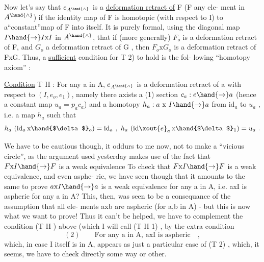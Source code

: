 
Now let's say that $e_{A^{\hand{\wedge}}}$ is a  \uline{deformation retract of} F (F any ele-%
ment in $A^{\hand{\wedge}}$) if the identity map of F is homotopic (with respect to I) to
a``constant''map of F into itself.  It is purely formal,  using the diagonal
map $I\hand{\to} I\mathrm{x}I$ in $A^{\hand{\wedge}}$,  that if (more generally) $F_o$ is a deformation retract
of F,  and $G_o$ a deformation retract of G ,  then $F_o\mathrm{x}G_o$ is a deformation
retract of FxG. Thus, a \uline{sufficient} condition for T 2) to hold is the fol-%
lowing ``homotopy axiom'' :

\uline{Condition}  T H :  For any  a in A,   $e_{A^{\hand{\wedge}}}$ is a deformation retract of
a with respect to $(I,e_o,e_1)$,  namely there axists a
(1)  section  $c_a : e\hand{\to} a$  (hence a constant map $u_a = p_a c_a$)
and a homotopy  $h_a : a\ \mathrm{x}\ I\hand{\to} a$ from $\mathrm{id}_a$  to $u_a$ ,  i.e.
a map $h_a$ such that
\[ h_a\ (\mathrm{id}_a\,\mathrm{x}\hand{$\delta$}_o) = \mathrm{id}_a\ ,\ h_a\ (\mathrm{id}\xout{e}_a\,\mathrm{x}\hand{$\delta$}_1) = u_a\ . \]

We have to be cautious though,  it oddurs to me now,  not to make a
``vicious circle'',  as the  argument used yesterday  makes use of the fact
that   $F\mathrm{x}I\hand{\to} F$  is a weak equivalence  To check that $F\mathrm{x}I\hand{\to} F$ is a weak equivalence,  and even asphe-%
ric,  we have seen though that it amounts to the same to prove $a\mathrm{x}I\hand{\to} a$ is a
weak equivalence for any a in A,  i.e. axI is aspheric for any a in A?
This,  then,  was seen to be a consequance of the assumption that all ele-%
ments axb are aspheric (for a,b in A)  -  but this  is now what we want to
prove!  Thus it can't be helped,  we have to complement the condition
(T H ) above  (which I will call  (T H 1) ,  by the extra condition
\[ (2)\qquad \text{For any a in A,  axI is aspheric}\quad , \]
which,  in case I itself is in A,  appears as just a particular case of
(T 2) ,  which, it seems,  we have to check directly some way or other.

